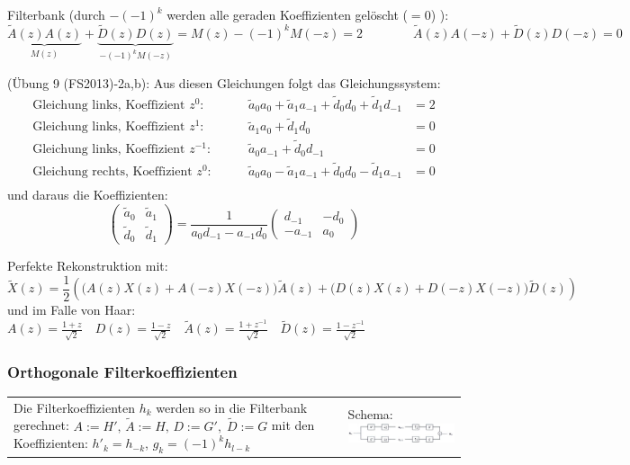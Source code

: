 \vspace{-0.5cm}

Filterbank (durch $-(-1)^k$ werden alle geraden Koeffizienten gelöscht ($=0$) ):
\[  
	\underbrace{\tilde{A}(z) A(z)}_{M(z)} + \underbrace{\tilde{D}(z)D(z)}_{-(-1)^k M(-z)} = M(z)-(-1)^kM(-z) = 2
	\qquad \qquad
	\tilde{A}(z)A(-z) + \tilde{D}(z)D(-z) = 0
\]

(Übung 9 (FS2013)-2a,b): Aus diesen Gleichungen folgt das Gleichungssystem:
\begin{align*}
  \text{Gleichung links, Koeffizient } z^0: \qquad & \tilde a_0 a_0 + \tilde a_1 a_{-1} + \tilde d_0 d_0 + \tilde d_1 d_{-1} &= 2 \\
  \text{Gleichung links, Koeffizient } z^1: \qquad & \tilde a_1 a_0 + \tilde d_1 d_0 &= 0 \\
  \text{Gleichung links, Koeffizient } z^{-1}: \qquad & \tilde a_0 a_{-1} + \tilde d_0 d_{-1} &= 0 \\
  \text{Gleichung rechts, Koeffizient } z^{0}: \qquad & \tilde a_0 a_0 - \tilde a_1 a_{-1} + \tilde d_0 d_0 - \tilde d_1 a_{-1} &= 0 \\
\end{align*}
und daraus die Koeffizienten:
\[
  \begin{pmatrix}
    \tilde a_0 & \tilde a_1\\
    \tilde d_0 & \tilde d_1
  \end{pmatrix}
  = \frac{1}{a_0 d_{-1} - a_{-1} d_0} \begin{pmatrix}
    d_{-1} & -d_0 \\
    -a_{-1} & a_0
  \end{pmatrix}
\]

Perfekte Rekonstruktion mit:
\[
\tilde{X}(z) = \frac12 \left( \big(A(z) X(z) + A(-z)X(-z)\big) \tilde{A}(z) + \big(D(z)X(z) + D(-z)X(-z)\big) \tilde{D}(z) \right)
\]
und im Falle von Haar: 
$A(z) = \frac{1+z}{\sqrt{2}} \quad 
D(z) = \frac{1-z}{\sqrt{2}} \quad 
\tilde{A}(z) = \frac{1+z^{-1}}{\sqrt{2}} \quad 
\tilde{D}(z) = \frac{1-z^{-1}}{\sqrt{2}}$
\\

\newpage

\subsubsection{Orthogonale Filterkoeffizienten }

\begin{tabularx}{\textwidth}{X | p{9cm}}
Die Filterkoeffizienten $h_k$ werden so in die Filterbank gerechnet:\newline
$A := H', \, \tilde A := H,\, D := G', \; \tilde D := G$\newline
mit den Koeffizienten: $h'_k = h_{-k}$, $g_k = (-1)^k h_{l-k}$
& Schema: \newline
  \includegraphics[width=9cm]{./content/MsaFilterbank.png}\\
\end{tabularx}\\
\\


